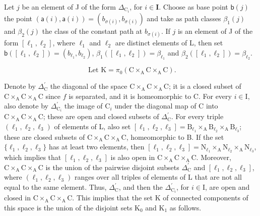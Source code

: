 Let \(j\) be an element of J of the form \(\Delta_{\mathrm{C}_i}\), for \(i \in \mathbf{I}\). Choose as base point \(\mathsf{b}(j)\) the point \((\mathsf{a}(i), \mathsf{a}(i)) = (b_{\sigma(i)}, b_{\sigma(i)})\) and take as path classes \(\beta_1(j)\) and \(\beta_2(j)\) the class of the constant path at \(b_{\sigma(i)}\). If \(j\) is an element of J of the form \([\ell_1, \ell_2]\), where \(\ell_1\) and \(\ell_2\) are distinct elements of L, then set \(\mathsf{b}([\ell_1, \ell_2]) = (b_{\ell_1}, b_{\ell_2})\), \(\beta_1([\ell_1, \ell_2]) = \beta_{\ell_1}\) and \(\beta_2([\ell_1, \ell_2]) = \beta_{\ell_2}\).

\[
\text { Let } \mathrm{K} = \pi_ {0} (\mathrm{C} \times_ {\mathrm{A}} \mathrm{C} \times_ {\mathrm{A}} \mathrm{C}).
\]

Denote by \(\Delta_{\mathrm{C}}^{\prime}\) the diagonal of the space \(\mathrm{C} \times_{\mathrm{A}} \mathrm{C} \times_{\mathrm{A}} \mathrm{C}\); it is a closed subset of \(\mathrm{C} \times_{\mathrm{A}} \mathrm{C} \times_{\mathrm{A}} \mathrm{C}\) since \(f\) is separated, and it is homeomorphic to C. For every \(i \in \mathrm{I}\), also denote by \(\Delta_{\mathrm{C}_i}^{\prime}\) the image of \(\mathrm{C}_i\) under the diagonal map of C into \(\mathrm{C} \times_{\mathrm{A}} \mathrm{C} \times_{\mathrm{A}} \mathrm{C}\); these are open and closed subsets of \(\Delta_{\mathrm{C}}^{\prime}\). For every triple \((\ell_1, \ell_2, \ell_3)\) of elements of L, also set \([\ell_1, \ell_2, \ell_3] = \mathrm{B}_{\ell_1} \times_{\mathrm{A}} \mathrm{B}_{\ell_2} \times_{\mathrm{A}} \mathrm{B}_{\ell_3}\); these are closed subsets of \(\mathrm{C} \times_{\mathrm{A}} \mathrm{C} \times_{\mathrm{A}} \mathrm{C}\), homeomorphic to B. If the set \(\{\ell_1, \ell_2, \ell_3\}\) has at least two elements, then \([\ell_1, \ell_2, \ell_3] = \mathrm{N}_{\ell_1} \times_{\mathrm{A}} \mathrm{N}_{\ell_2} \times_{\mathrm{A}} \mathrm{N}_{\ell_3}\), which implies that \([\ell_1, \ell_2, \ell_3]\) is also open in \(\mathrm{C} \times_{\mathrm{A}} \mathrm{C} \times_{\mathrm{A}} \mathrm{C}\). Moreover, \(\mathrm{C} \times_{\mathrm{A}} \mathrm{C} \times_{\mathrm{A}} \mathrm{C}\) is the union of the pairwise disjoint subsets \(\Delta_{\mathrm{C}}^{\prime}\) and \([\ell_1, \ell_2, \ell_3]\), where \((\ell_1, \ell_2, \ell_3)\) ranges over all triples of elements of L that are not all equal to the same element. Thus, \(\Delta_{\mathrm{C}}^{\prime}\), and then the \(\Delta_{\mathrm{C}_i}^{\prime}\), for \(i \in \mathrm{I}\), are open and closed in \(\mathrm{C} \times_{\mathrm{A}} \mathrm{C} \times_{\mathrm{A}} \mathrm{C}\). This implies that the set K of connected components of this space is the union of the disjoint sets \(\mathrm{K}_0\) and \(\mathrm{K}_1\) as follows.

